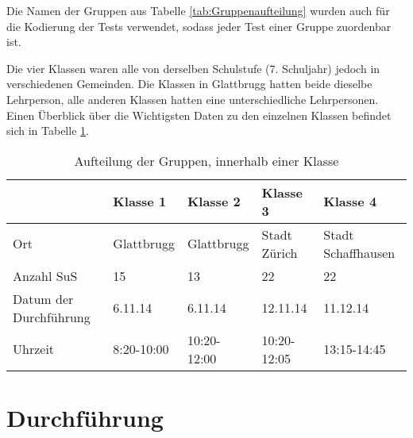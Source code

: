 Die Namen der Gruppen aus Tabelle \ref{tab:Gruppenaufteilung} wurden auch für die Kodierung der Tests verwendet, sodass jeder Test einer Gruppe zuordenbar ist.

Die vier Klassen waren alle von derselben Schulstufe (7. Schuljahr) jedoch in verschiedenen Gemeinden. Die Klassen in Glattbrugg hatten beide dieselbe Lehrperson, alle anderen Klassen hatten eine unterschiedliche Lehrpersonen. Einen Überblick über die Wichtigsten Daten zu den einzelnen Klassen befindet sich in Tabelle \ref{tab:Klassen}. 


\begin{table}[htbp]
  \centering
  \begin{tabular}{|p{2.3cm}|p{3cm}|p{3cm}|p{3cm}|p{3cm}|}
  \hline & Klasse 1 & Klasse 2 & Klasse 3 & Klasse 4 \\ 
  \hline Ort & Glattbrugg & Glattbrugg & Stadt Zürich & Stadt Schaffhausen \\
  \hline Anzahl SuS & 15 & 13 & 22 & 22 \\
  \hline Datum der Durchführung & 6.11.14 & 6.11.14 & 12.11.14 & 11.12.14\\
  \hline Uhrzeit & 8:20-10:00 & 10:20-12:00& 10:20-12:05 & 13:15-14:45 \\
  \hline
  \end{tabular} 
  \caption{Aufteilung der Gruppen, innerhalb einer Klasse}
  \label{tab:Klassen}
\end{table}





\section{Durchführung}